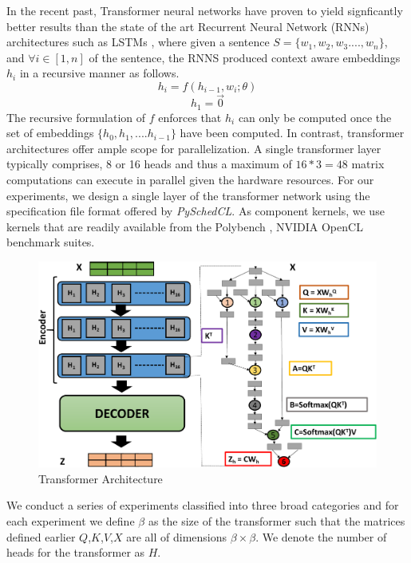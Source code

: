 	\par In the recent past, Transformer \cite{DBLP:journals/corr/VaswaniSPUJGKP17} neural networks have proven to yield signficantly better results than the state of the art Recurrent Neural Network (RNNs) architectures such as LSTMs \cite{hochreiter1997long}, where given a sentence $ S = \{w_1,w_2,w_3....,w_n\} $, and $\forall i \in [1,n]$  \cite{NIPS2013_5021} \cite{Pennington14glove:global} of the sentence, the RNNS produced  context aware embeddings $h_i$ in a recursive manner as follows.
	$$
	h_i = f(h_{i-1},w_i;\theta)
	$$
	$$
	h_1 = \vec{0}
	$$
	The recursive formulation of $f$ enforces that $h_{i}$ can only be computed once the set of embeddings $\{h_0,h_1,....h_{i-1}\}$ have been computed. In contrast, transformer architectures offer ample scope for parallelization.
	A single transformer layer typically comprises, 8 or 16 heads and thus a maximum of $16*3=48$ matrix computations can execute in parallel given the hardware resources. For our experiments, we design a single layer of the transformer network using the specification file format offered by {\em PySchedCL}. As component kernels, we use kernels that are readily available from the Polybench \cite{polybench}, NVIDIA OpenCL \cite{nvidia} benchmark suites. 
	\begin{figure}[ht]
		\centering
		\includegraphics[scale=0.325]{Pictures/TransformerArch.pdf}
		\caption{\small Transformer Architecture\label{fig:transformer}}
	\end{figure}
	\par We conduct a series of experiments classified into three broad categories and for each experiment we define $\beta$ as the size of the transformer such that the matrices defined earlier $Q$,$K$,$V$,$X$ are all of dimensions $\beta \times \beta$. We denote the number of heads for the transformer as $H$. 
